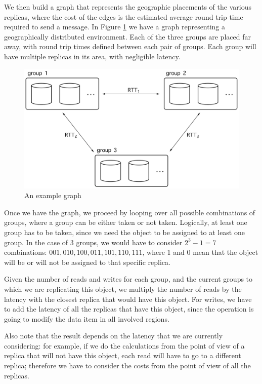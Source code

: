 We then build a graph that represents the geographic placements of the various replicas, where the cost of the edges is the estimated average round trip time required to send a message. In Figure \ref{fig:graph} we have a graph representing a geographically distributed environment. Each of the three groups are placed far away, with round trip times defined between each pair of groups. Each group will have multiple replicas in its area, with negligible latency.

\begin{figure}[!htb]
  \centering
  \includegraphics[width=\textwidth,height=\textheight,keepaspectratio]{img/graph.png}
  \caption{An example graph}
  \label{fig:graph}
\end{figure}

Once we have the graph, we proceed by looping over all possible combinations of groups, where a group can be either taken or not taken. Logically, at least one group has to be taken, since we need the object to be assigned to at least one group. In the case of 3 groups, we would have to consider $2^3 -1 = 7$ combinations: $001, 010, 100, 011, 101, 110, 111$, where 1 and 0 mean that the object will be or will not be assigned to that specific replica.

Given the number of reads and writes for each group, and the current groups to which we are replicating this object, we multiply the number of reads by the latency with the closest replica that would have this object. For writes, we have to add the latency of all the replicas that have this object, since the operation is going to modify the data item in all involved regions.

Also note that the result depends on the latency that we are currently considering: for example, if we do the calculations from the point of view of a replica that will not have this object, each read will have to go to a different replica; therefore we have to consider the costs from the point of view of all the replicas.

